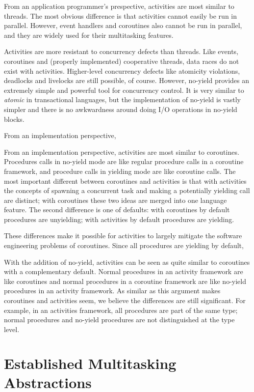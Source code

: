 \documentclass[10pt,preprint]{sigplanconf}
\begin{document}
From an application programmer's prespective, activities are most similar to threads.
The most obvious difference is that activities cannot easily be run in parallel.
However, event handlers and coroutines also cannot be run in parallel, and they are widely used for their multitasking features.

Activities are more resistant to concurrency defects than threads.
Like events, coroutines and (properly implemented) cooperative threads, data races do not exist with activities.
Higher-level concurrency defects like atomicity violations, deadlocks and livelocks are still possible, of course.
However, no-yield provides an extremely simple and powerful tool for concurrency control.
It is very similar to \emph{atomic} in transactional languages, but the implementation of no-yield is vastly simpler and there is no awkwardness around doing I/O operations in no-yield blocks.

From an implementation perspective, 


From an implementation perspective, activities are most similar to coroutines.
Procedures calls in no-yield mode are like regular procedure calls in a coroutine framework, and procedure calls in yielding mode are like coroutine calls.
The most important different between coroutines and activities is that with activities the concepts of spawning a concurrent task and making a potentially yielding call are distinct; with coroutines these two ideas are merged into one language feature.
The second difference is one of defaults: with coroutines by default procedures are unyielding; with activities by default procedures are yielding.

These differences make it possible for activities to largely mitigate the software engineering problems of coroutines.
Since all procedures are yielding by default, 

With the addition of no-yield, activities can be seen as quite similar to coroutines with a complementary default.
Normal procedures in an activity framework are like coroutines and normal procedures in a coroutine framework are like no-yield procedures in an activity framework.
As similar as this argument makes coroutines and activities seem, we believe the differences are still significant.
For example, in an activities framework, all procedures are part of the same type; normal procedures and no-yield procedures are not distinguished at the type level.

\section{Established Multitasking Abstractions}
\end{document}
